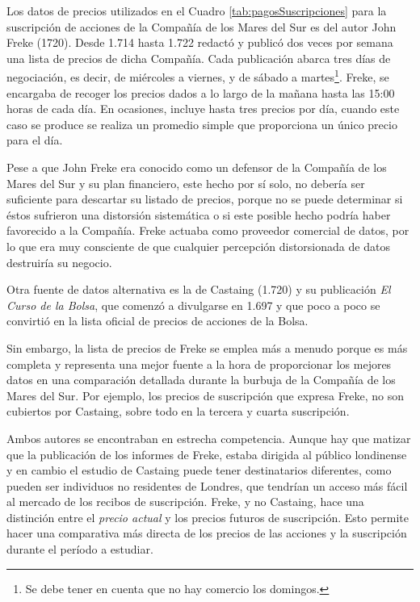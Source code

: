 


Los datos de precios utilizados en el Cuadro \ref{tab:pagosSuscripciones} para la suscripción de acciones de la Compañía de los Mares del Sur es del autor John Freke (1720).  Desde 1.714 hasta 1.722 redactó y publicó dos veces por semana una lista de precios de dicha Compañía. Cada publicación abarca tres días de negociación, es decir, de miércoles a viernes, y de sábado a martes\footnote{Se debe tener en cuenta que no hay comercio los domingos.}. Freke, se encargaba de recoger los precios dados a lo largo de la mañana hasta las 15:00 horas de cada día. En ocasiones, incluye hasta tres precios por día, cuando este caso se produce se realiza un promedio simple que proporciona un único precio para el día. 

Pese a que John Freke era conocido como un defensor de la Compañía de los Mares del Sur y su plan financiero, este hecho por sí solo, no debería ser suficiente para descartar su listado de precios, porque no se puede determinar si éstos sufrieron una distorsión sistemática o si este posible hecho podría haber favorecido a la Compañía. Freke actuaba como proveedor comercial de datos, por lo que era muy consciente de que cualquier percepción distorsionada de datos destruiría su negocio. 

Otra fuente de datos alternativa es la de Castaing (1.720) y su publicación \emph{El Curso de la Bolsa}, que comenzó a divulgarse en 1.697 y que poco a poco se convirtió en la lista oficial de precios de acciones de la Bolsa.

Sin embargo, la lista de precios de Freke se emplea más a menudo porque es más completa y representa una mejor fuente a la hora de proporcionar los mejores datos en una comparación detallada durante la burbuja de la Compañía de los Mares del Sur. Por ejemplo, los precios de suscripción que expresa Freke, no son cubiertos por Castaing, sobre todo en la tercera y cuarta suscripción. 

Ambos autores se encontraban en estrecha competencia. Aunque hay que matizar que la publicación de los informes de Freke, estaba dirigida al público londinense y en cambio el estudio de Castaing puede tener destinatarios diferentes, como pueden ser individuos no residentes de Londres, que tendrían un acceso más fácil al mercado de los recibos de suscripción.  Freke, y no Castaing, hace una distinción entre el \emph{precio actual} y los precios futuros de suscripción. Esto permite hacer una comparativa más directa de los precios de las acciones y la suscripción durante el período a estudiar. 


